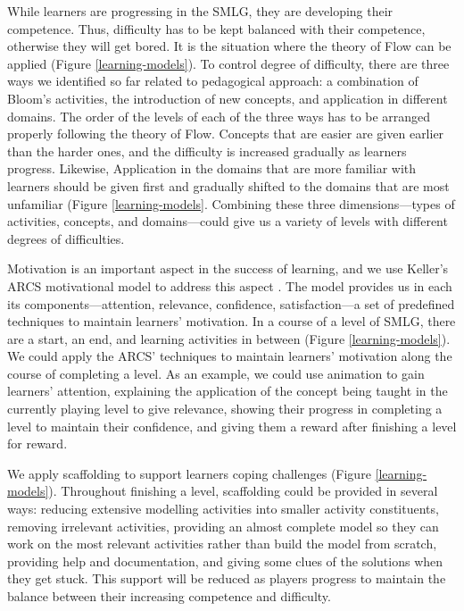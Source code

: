 \documentclass[12pt, a4paper]{report} \usepackage[titletoc]{appendix}
\begin{document}
While learners are progressing in the SMLG, they are developing their competence. Thus, difficulty has to be kept balanced with their competence, otherwise they will get bored. It is the situation where the theory of Flow can be applied (Figure \ref{learning-models}). To control degree of difficulty, there are three ways we identified so far related to pedagogical approach: a combination of Bloom's activities, the introduction of new concepts, and application in different domains. The order of the levels of each of the three ways has to be arranged properly following the theory of Flow. Concepts that are easier are given earlier than the harder ones, and the difficulty is increased gradually as learners progress. Likewise, Application in the domains that are more familiar with learners should be given first and gradually shifted to the domains that are most unfamiliar (Figure \ref{learning-models}. Combining these three dimensions---types of activities, concepts, and domains---could give us a variety of levels with different degrees of difficulties.

Motivation is an important aspect in the success of learning, and we use Keller's ARCS motivational model to address this aspect \cite{keller2010motivational}. The model provides us in each its components---attention, relevance, confidence, satisfaction---a set of predefined techniques to maintain learners' motivation. In a course of a level of SMLG, there are a start, an end, and learning activities in between (Figure \ref{learning-models}). We could apply the ARCS' techniques to maintain learners' motivation along the course of completing a level. As an example, we could use animation to gain learners' attention, explaining the application of the concept being taught in the currently playing level to give relevance, showing their progress in completing a level to maintain their confidence, and giving them a reward after finishing a level for reward.
 
We apply scaffolding \cite{vygotsky1978mind, wood1976role} to support learners coping challenges (Figure \ref{learning-models}). Throughout finishing a level, scaffolding could be provided in several ways: reducing extensive modelling activities into smaller activity constituents, removing irrelevant activities, providing an almost complete model so they can work on the most relevant activities rather than build the model from scratch, providing help and documentation, and giving some clues of the solutions when they get stuck. This support will be reduced as players progress to maintain the balance between their increasing competence and difficulty.
\end{document}
